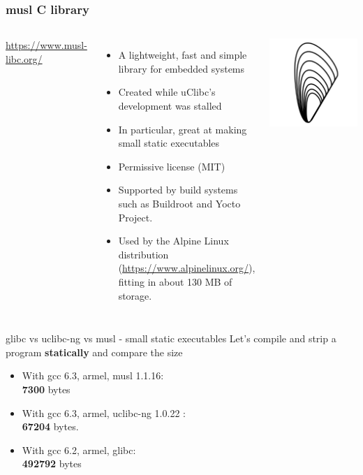 \begin{frame}
  \frametitle{musl C library}
  \begin{columns}
      \url{https://www.musl-libc.org/}
      \begin{itemize}
      \item A lightweight, fast and simple library for embedded systems
      \item Created while uClibc's development was stalled
      \item In particular, great at making small static executables
      \item Permissive license (MIT)
      \item Supported by build systems such as Buildroot and Yocto
        Project.
      \item Used by the Alpine Linux distribution
        (\url{https://www.alpinelinux.org/}), fitting in about 130 MB of storage.
      \end{itemize}
    \includegraphics[width=\textwidth]{slides/c-libraries/musl.png}
  \end{columns}
\end{frame}

\begin{frame}{glibc vs uclibc-ng vs musl - small static executables}
  Let's compile and strip a  program {\bf statically} and
compare the size
  \begin{itemize}
    \item With gcc 6.3, armel, musl 1.1.16:\\
          {\bf 7300} bytes
    \item With gcc 6.3, armel, uclibc-ng 1.0.22 :\\
          {\bf 67204} bytes.
    \item With gcc 6.2, armel, glibc:\\
          {\bf 492792} bytes
  \end{itemize}
\end{frame}

